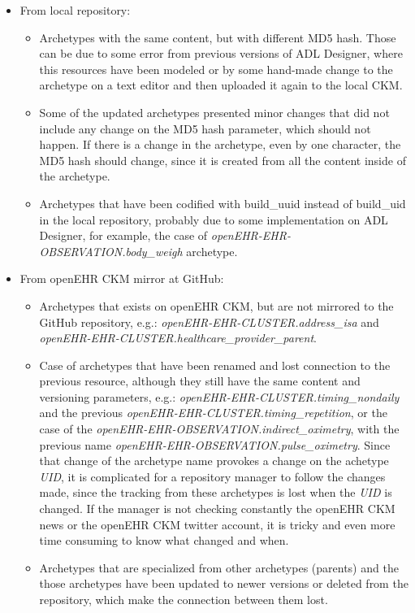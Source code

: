 \documentclass[mim_thesis.tex]{subfiles}
\begin{document}
\begin{itemize}[noitemsep]
\item From local repository:
\begin{itemize}[noitemsep]
\item Archetypes with the same content, but with different MD5 hash. Those can be due to some error from previous versions of ADL Designer, where this resources have been modeled or by some hand-made change to the archetype on a text editor and then uploaded it again to the local CKM. 
\item Some of the updated archetypes presented minor changes that did not include any change on the MD5 hash parameter, which should not happen. If there is a change in the archetype, even by one character, the MD5 hash should change, since it is created from all the content inside of the archetype.
\item Archetypes that have been codified with build\_uuid instead of build\_uid in the local repository, probably due to some implementation on ADL Designer, for example, the case of \textit{openEHR-EHR-OBSERVATION.body\_weigh} archetype.

\end{itemize}
\item From openEHR CKM mirror at GitHub:
\begin{itemize}[noitemsep]
\item Archetypes that exists on openEHR CKM, but are not mirrored to the GitHub repository, e.g.: \textit{openEHR-EHR-CLUSTER.address\_isa} and \textit{openEHR-EHR-CLUSTER.healthcare\_provider\_parent}.
\item Case of archetypes that have been renamed and lost connection to the previous resource, although they still have the same content and versioning parameters, e.g.: \textit{openEHR-EHR-CLUSTER.timing\_nondaily} and the previous \textit{openEHR-EHR-CLUSTER.timing\_repetition}, or the case of the \textit{openEHR-EHR-OBSERVATION.indirect\_oximetry}, with the previous name \textit{openEHR-EHR-OBSERVATION.pulse\_oximetry}. Since that change of the archetype name provokes a change on the achetype \textit{UID}, it is complicated for a repository manager to follow the changes made, since the tracking from these archetypes is lost when the \textit{UID} is changed. If the manager is not checking constantly the openEHR CKM news or the openEHR CKM twitter account, it is tricky and even more time consuming to know what changed and when.
\item Archetypes that are specialized from other archetypes (parents) and the those archetypes have been updated to newer versions or deleted from the repository, which make the connection between them lost.
\end{itemize}
\end{itemize}
\end{document}
